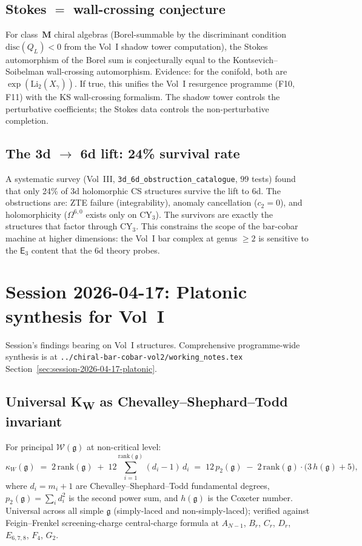 \documentclass[11pt]{article}
\begin{document}
\subsection{Stokes $=$ wall-crossing conjecture}

For class~$\mathbf{M}$ chiral algebras (Borel-summable by the
discriminant condition $\mathrm{disc}(Q_L) < 0$ from the Vol~I
shadow tower computation), the Stokes automorphism of the Borel
sum is conjecturally equal to the Kontsevich--Soibelman
wall-crossing automorphism. Evidence: for the conifold, both are
$\exp(\mathrm{Li}_2(X_\gamma))$. If true, this unifies the Vol~I
resurgence programme (F10, F11) with the KS wall-crossing
formalism. The shadow tower controls the perturbative coefficients;
the Stokes data controls the non-perturbative completion.

\subsection{The 3d $\to$ 6d lift: 24\% survival rate}

A systematic survey (Vol~III, \texttt{3d\_6d\_obstruction\_catalogue},
$99$ tests) found that only 24\% of 3d holomorphic CS structures
survive the lift to 6d. The obstructions are: ZTE failure
(integrability), anomaly cancellation ($c_2 = 0$), and
holomorphicity ($\Omega^{6,0}$ exists only on CY$_3$). The
survivors are exactly the structures that factor through CY$_3$.
This constrains the scope of the bar-cobar machine at higher
dimensions: the Vol~I bar complex at genus $\geq 2$ is
sensitive to the $\mathsf{E}_3$ content that the 6d theory probes.

\section{Session 2026-04-17: Platonic synthesis for Vol~I}
\label{sec:vol1-session-2026-04-17}

Session's findings bearing on Vol~I structures. Comprehensive
programme-wide synthesis is at
\texttt{../chiral-bar-cobar-vol2/working\_notes.tex}
Section~\ref*{sec:session-2026-04-17-platonic}.

\subsection{Universal K\textsubscript{W} as Chevalley--Shephard--Todd invariant}

For principal $\mathcal{W}(\mathfrak{g})$ at non-critical level:
\begin{equation}
  \kappa_W(\mathfrak{g})
  \;=\;
  2\,\mathrm{rank}(\mathfrak{g})
  \;+\;
  12 \sum_{i=1}^{\mathrm{rank}(\mathfrak{g})} (d_i - 1)\,d_i
  \;=\;
  12\,p_2(\mathfrak{g})
  \;-\;
  2\,\mathrm{rank}(\mathfrak{g})\cdot\bigl(3\,h(\mathfrak{g}) + 5\bigr),
\end{equation}
where $d_i = m_i + 1$ are Chevalley--Shephard--Todd fundamental
degrees, $p_2(\mathfrak{g}) = \sum_i d_i^2$ is the second power sum,
and $h(\mathfrak{g})$ is the Coxeter number. Universal across all
simple $\mathfrak{g}$ (simply-laced and non-simply-laced); verified
against Feigin--Frenkel screening-charge central-charge formula at
$A_{N-1}$, $B_r$, $C_r$, $D_r$, $E_{6,7,8}$, $F_4$, $G_2$.
\end{document}

